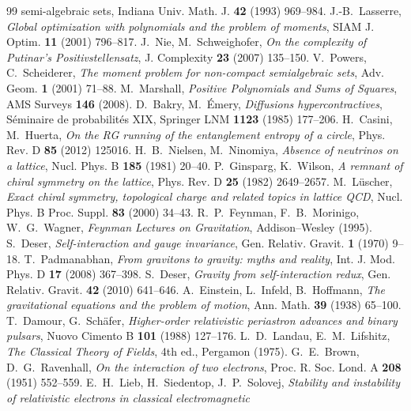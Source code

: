 \documentclass[11pt]{article}
\theoremstyle{definition}
\theoremstyle{remark}
\begin{document}
\begin{thebibliography}{99}
{semi-algebraic sets}, Indiana Univ. Math. J. \textbf{42} (1993)
969--984.
 J.-B.~Lasserre, \emph{Global optimization with
polynomials and the problem of moments}, SIAM J. Optim. \textbf{11}
(2001) 796--817.
 J.~Nie, M.~Schweighofer, \emph{On the complexity of
Putinar's Positivstellensatz}, J. Complexity \textbf{23} (2007)
135--150.
 V.~Powers, C.~Scheiderer, \emph{The moment problem for
non-compact semialgebraic sets}, Adv. Geom. \textbf{1} (2001) 71--88.
 M.~Marshall, \emph{Positive Polynomials and Sums of
Squares}, AMS Surveys \textbf{146} (2008).
 D.~Bakry, M.~\'Emery, \emph{Diffusions hypercontractives},
S\'eminaire de probabilit\'es XIX, Springer LNM \textbf{1123} (1985)
177--206.
 H.~Casini, M.~Huerta, \emph{On the RG running of the
entanglement entropy of a circle}, Phys. Rev. D \textbf{85} (2012)
125016.
 H.~B.~Nielsen, M.~Ninomiya, \emph{Absence of neutrinos
on a lattice}, Nucl. Phys. B \textbf{185} (1981) 20--40.
 P.~Ginsparg, K.~Wilson, \emph{A remnant of chiral
symmetry on the lattice}, Phys. Rev. D \textbf{25} (1982) 2649--2657.
 M.~L\"uscher, \emph{Exact chiral symmetry,
topological charge and related topics in lattice QCD}, Nucl. Phys. B
Proc. Suppl. \textbf{83} (2000) 34--43.
 R.~P.~Feynman, F.~B.~Morinigo, W.~G.~Wagner,
\emph{Feynman Lectures on Gravitation}, Addison--Wesley (1995).
 S.~Deser, \emph{Self-interaction and gauge
invariance}, Gen. Relativ. Gravit. \textbf{1} (1970) 9--18.
 T.~Padmanabhan, \emph{From gravitons to gravity:
myths and reality}, Int. J. Mod. Phys. D \textbf{17} (2008) 367--398.
 S.~Deser, \emph{Gravity from self-interaction
redux}, Gen. Relativ. Gravit. \textbf{42} (2010) 641--646.
 A.~Einstein, L.~Infeld, B.~Hoffmann, \emph{The
gravitational equations and the problem of motion}, Ann. Math.
\textbf{39} (1938) 65--100.
 T.~Damour, G.~Sch\"afer, \emph{Higher-order
relativistic periastron advances and binary pulsars}, Nuovo Cimento B
\textbf{101} (1988) 127--176.
 L.~D.~Landau, E.~M.~Lifshitz, \emph{The Classical
Theory of Fields}, 4th ed., Pergamon (1975).
 G.~E.~Brown, D.~G.~Ravenhall, \emph{On the
interaction of two electrons}, Proc. R. Soc. Lond. A \textbf{208} (1951)
552--559.
 E.~H.~Lieb, H.~Siedentop, J.~P.~Solovej, \emph{Stability
and instability of relativistic electrons in classical electromagnetic
}
\end{thebibliography}
\end{document}
